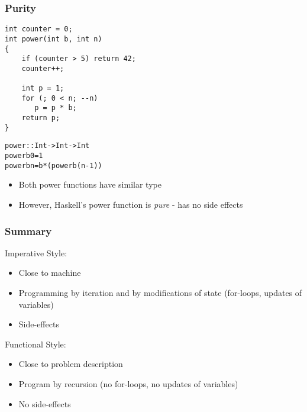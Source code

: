 \documentclass[pdftex,landscape,final,handout,british]{beamer}
\begin{document}

\begin{frame}[fragile]
  \frametitle{Purity}
\begin{verbatim}  
int counter = 0;
int power(int b, int n)
{
    if (counter > 5) return 42;
    counter++;

    int p = 1;
    for (; 0 < n; --n)
       p = p * b;
    return p;
}  
\end{verbatim}  

\pause

\begin{alltt}
power :: Int -> Int -> Int
power b 0 = 1
power b n = b * (power b (n-1))
\end{alltt}

\pause

\begin{itemize}
    \item Both power functions have similar type
    \item However, Haskell's power function is \emph{pure} - has no side effects
\end{itemize}
\end{frame}  



\begin{frame}
    \frametitle{Summary}

  Imperative Style:
  \begin{itemize}
    \item Close to machine   
    \item Programming by iteration and by modifications of state (for-loops, updates of variables)
    \item Side-effects
  \end{itemize}

  Functional Style:
  \begin{itemize}
    \item Close to problem description
    \item Program by recursion (no for-loops, no updates of variables)
    \item No side-effects

  \end{itemize}
\end{frame}
\end{document}
